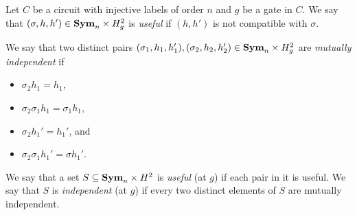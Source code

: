 \documentclass[../paper.tex]{subfiles}
\begin{document}


\begin{definition}
  Let $C$ be a circuit with injective labels of order $n$ and $g$ be a gate in
  $C$. We say that $(\sigma, h, h') \in \text{\textbf{Sym}}_n \times H^2_g$ is \emph{useful} if
  $(h, h')$ is not compatible with $\sigma$.

  We say that two distinct pairs $(\sigma_1, h_1, h_1'), (\sigma_2, h_2, h_2')
  \in \text{\textbf{Sym}}_n\times H^2_g$ are \emph{mutually independent} if
  \begin{itemize}
    \setlength\itemsep{0mm}
  \item $\sigma_2 h_1 = h_1$,
  \item $\sigma_2 \sigma_1 h_1 = \sigma_1 h_1$,
  \item $\sigma_2 h_1' = h_1'$, and
  \item $\sigma_2 \sigma_1 h_1' = \sigma h_1'$.
  \end{itemize}
  We say that a set $S \subseteq \text{\textbf{Sym}}_n \times H^2$ is \emph{useful} (at $g$) if
  each pair in it is useful. We say that $S$ is \emph{independent} (at $g$) if
  every two distinct elements of $S$ are mutually independent.
\end{definition}


\end{document}
